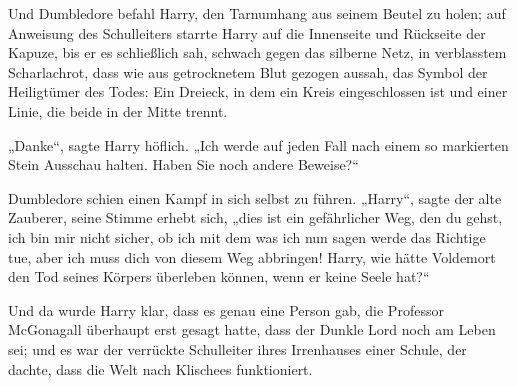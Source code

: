 Und Dumbledore befahl Harry, den Tarnumhang aus seinem Beutel zu holen; auf Anweisung des Schulleiters starrte Harry auf die Innenseite und Rückseite der Kapuze, bis er es schließlich sah, schwach gegen das silberne Netz, in verblasstem Scharlachrot, dass wie aus getrocknetem Blut gezogen aussah, das Symbol der Heiligtümer des Todes: Ein Dreieck, in dem ein Kreis eingeschlossen ist und einer Linie, die beide in der Mitte trennt.

„Danke“, sagte Harry höflich.
„Ich werde auf jeden Fall nach einem so markierten Stein Ausschau halten. Haben Sie noch andere Beweise?“

Dumbledore schien einen Kampf in sich selbst zu führen.
„Harry“, sagte der alte Zauberer, seine Stimme erhebt sich, „dies ist ein gefährlicher Weg, den du gehst, ich bin mir nicht sicher, ob ich mit dem was ich nun sagen werde das Richtige tue, aber ich muss dich von diesem Weg abbringen! Harry, wie hätte Voldemort den Tod seines Körpers überleben können, wenn er keine Seele hat?“

Und da wurde Harry klar, dass es genau eine Person gab, die Professor McGonagall überhaupt erst gesagt hatte, dass der Dunkle Lord noch am Leben sei; und es war der verrückte Schulleiter ihres Irrenhauses einer Schule, der dachte, dass die Welt nach Klischees funktioniert.


